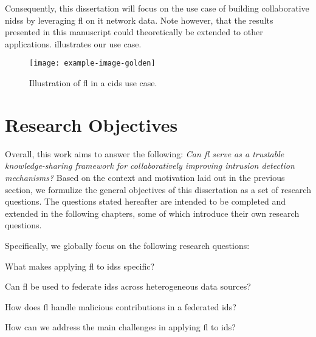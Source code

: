Consequently, this dissertation will focus on the use case of building collaborative \glspl{nids} by leveraging \gls{fl} on \gls{it} network data.
Note however, that the results presented in this manuscript could theoretically be extended to other applications.
 illustrates our use case.

\begin{figure}
  \centering
  \texttt{[image: example-image-golden]}
  \caption{Illustration of \gls{fl} in a \gls{cids} use case.}
  \label{fig:intro.usecase}
\end{figure}

\section{Research Objectives\label{sec:intro.questions}}

Overall, this work aims to answer the following: \emph{Can \gls{fl} serve as a trustable knowledge-sharing framework for collaboratively improving intrusion detection mechanisms?}
Based on the context and motivation laid out in the previous section, we formulize the general objectives of this dissertation as a set of research questions.
The questions stated hereafter are intended to be completed and extended in the following chapters, some of which introduce their own research questions.

Specifically, we globally focus on the following research questions:

\begin{questions}
  \item What makes applying \gls{fl} to \glspl{ids} specific? \label{rq:intro.fids}
  \item Can \gls{fl} be used to federate \glspl{ids} across heterogeneous data sources? \label{rq:intro.heterogeneity}
  \item How does \gls{fl} handle malicious contributions in a federated \gls{ids}? \label{rq:intro.malicious}
  \item How can we address the main challenges in applying \gls{fl} to \gls{ids}? \label{rq:intro.propositions}
\end{questions}


